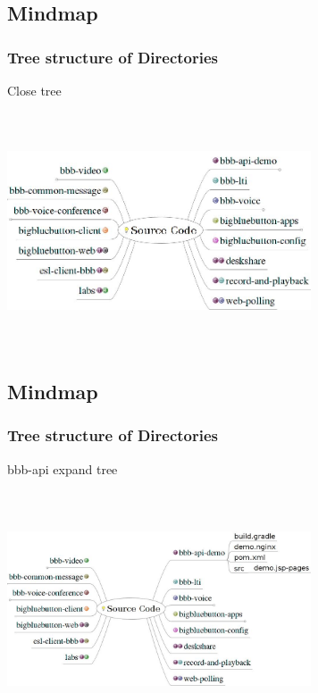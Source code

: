 \documentclass{beamer}
\begin{document}
\subsection*{Mindmap}
\begin{frame}
\frametitle{Tree structure of Directories}
{Close tree}

\includegraphics[height=70mm,width=90mm]{./images/SourceCodeintro.jpeg}
\end{frame}



\subsection*{Mindmap}
\begin{frame}
\frametitle{Tree structure of Directories}
{bbb-api expand tree }

\includegraphics[height=70mm,width=90mm]{./images/SourceCode1.jpeg}
\end{frame}
\end{document}
